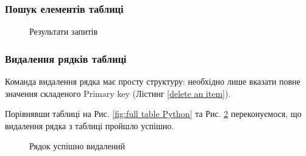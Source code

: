 \documentclass[a4paper,14pt]{extarticle} %
\begin{document}
\subsubsection*{Пошук елементів таблиці}



\begin{figure}[H]
    \caption{Результати запитів}
    \label{fig:Query Python}
\end{figure}

\subsubsection*{Видалення рядків таблиці}

Команда видалення рядка має просту структуру: необхідно лише вказати повне значення складеного Primary key 
(Лістинг \ref{delete an item}). 



Порівнявши таблиці на Рис. \ref{fig:full table Python} та Рис. \ref{fig:delete an item Python} переконуємося, 
що видалення рядка з таблиці пройшло успішно.

\begin{figure}[H]
    \caption{Рядок успішно видалений}
    \label{fig:delete an item Python}
\end{figure}
\end{document}
